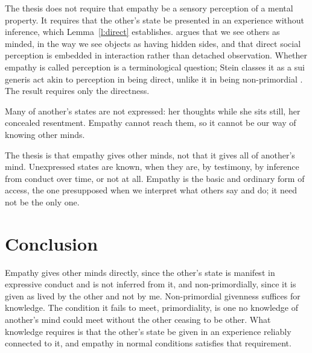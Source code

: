 \documentclass{situationist-preprint}
\begin{document}
\begin{reply}
The thesis does not require that empathy be a sensory perception of a mental property. It requires that the other's state be presented in an experience without inference, which Lemma~\ref{l:direct} establishes. \citet{Smith2010} argues that we see others as minded, in the way we see objects as having hidden sides, and \citet{Gallagher2008} that direct social perception is embedded in interaction rather than detached observation. Whether empathy is called perception is a terminological question; Stein classes it as a sui generis act akin to perception in being direct, unlike it in being non-primordial \citep{Stein1917}. The result requires only the directness.
\end{reply}

\begin{objection}\label{o:hidden}
Many of another's states are not expressed: her thoughts while she sits still, her concealed resentment. Empathy cannot reach them, so it cannot be our way of knowing other minds.
\end{objection}

\begin{reply}
The thesis is that empathy gives other minds, not that it gives all of another's mind. Unexpressed states are known, when they are, by testimony, by inference from conduct over time, or not at all. Empathy is the basic and ordinary form of access, the one presupposed when we interpret what others say and do; it need not be the only one.
\end{reply}

\section{Conclusion}

Empathy gives other minds directly, since the other's state is manifest in expressive conduct and is not inferred from it, and non-primordially, since it is given as lived by the other and not by me. Non-primordial givenness suffices for knowledge. The condition it fails to meet, primordiality, is one no knowledge of another's mind could meet without the other ceasing to be other. What knowledge requires is that the other's state be given in an experience reliably connected to it, and empathy in normal conditions satisfies that requirement.
\end{document}
